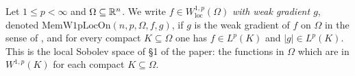 \begin{definition}
Let $1\le p<\infty$ and $\Omega\subseteq\mathbb{R}^n$. We write
$f\in W^{1,p}_{\mathrm{loc}}(\Omega)$ \emph{with weak gradient $g$}, denoted
$\mathrm{MemW1pLocOn}(n,p,\Omega,f,g)$, if $g$ is the weak gradient of $f$ on
$\Omega$ in the sense of , and for every compact
$K\subseteq\Omega$ one has $f\in L^p(K)$ and $|g|\in L^p(K)$. This is the local
Sobolev space of \S1 of the paper: the functions in $\Omega$ which are in
$W^{1,p}(K)$ for each compact $K\subseteq\Omega$.
\end{definition}
